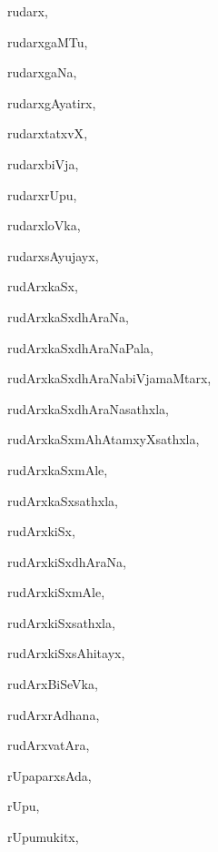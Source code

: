 \begin{multicols}{3}
{\noindent
{rudarx}, \pageref{rudarx}

\noindent
{rudarxgaMTu}, \pageref{rudarxgaMTu}

\noindent
{rudarxgaNa}, \pageref{rudarxgaNa}

\noindent
{rudarxgAyatirx}, \pageref{rudarxgAyatirx}

\noindent
{rudarxtatxvX}, \pageref{rudarxtatxvX}

\noindent
{rudarxbiVja}, \pageref{rudarxbiVja}

\noindent
{rudarxrUpu}, \pageref{rudarxrUpu}

\noindent
{rudarxloVka}, \pageref{rudarxloVka}

\noindent
{rudarxsAyujayx}, \pageref{rudarxsAyujayx}

\noindent
{rudArxkaSx}, \pageref{rudArxkaSx}

\noindent
{rudArxkaSxdhAraNa}, \pageref{rudArxkaSxdhAraNa}

\noindent
{rudArxkaSxdhAraNaPala}, \pageref{rudArxkaSxdhAraNaPala}

\noindent
{rudArxkaSxdhAraNabiVjamaMtarx}, \pageref{rudArxkaSxdhAraNabiVjamaMtarx}

\noindent
{rudArxkaSxdhAraNasathxla}, \pageref{rudArxkaSxdhAraNasathxla}

\noindent
{rudArxkaSxmAhAtamxyXsathxla}, \pageref{rudArxkaSxmAhAtamxyXsathxla}

\noindent
{rudArxkaSxmAle}, \pageref{rudArxkaSxmAle}

\noindent
{rudArxkaSxsathxla}, \pageref{rudArxkaSxsathxla}

\noindent
{rudArxkiSx}, \pageref{rudArxkiSx}

\noindent
{rudArxkiSxdhAraNa}, \pageref{rudArxkiSxdhAraNa}

\noindent
{rudArxkiSxmAle}, \pageref{rudArxkiSxmAle}

\noindent
{rudArxkiSxsathxla}, \pageref{rudArxkiSxsathxla}

\noindent
{rudArxkiSxsAhitayx}, \pageref{rudArxkiSxsAhitayx}

\noindent
{rudArxBiSeVka}, \pageref{rudArxBiSeVka}

\noindent
{rudArxrAdhana}, \pageref{rudArxrAdhana}

\noindent
{rudArxvatAra}, \pageref{rudArxvatAra}

\noindent
{rUpaparxsAda}, \pageref{rUpaparxsAda}

\noindent
{rUpu}, \pageref{rUpu}

\noindent
{rUpumukitx}, \pageref{rUpumukitx}

}
\end{multicols}
